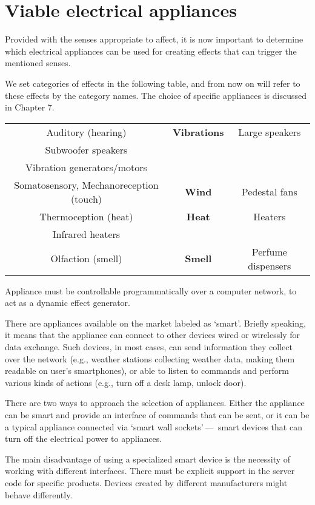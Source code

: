 \hypertarget{x-viable-electrical-appliances}{\section{Viable electrical appliances}}
Provided with the senses appropriate to affect, it is now important to determine
which electrical appliances can be used for creating effects that can trigger 
the mentioned senses.

We set categories of effects in the following table, and from now on will
refer to these effects by the category names. The choice of specific appliances
is discussed in Chapter 7.

\begin{center}
\begin{tabular}{|c|c|c|}
\hline
Auditory (hearing) & \textbf{Vibrations} & Large speakers \\ 
Subwoofer speakers \\ 
Vibration generators/motors \\ 
Somatosensory, Mechanoreception (touch) & \textbf{Wind} & Pedestal fans \\ 
Thermoception (heat) & \textbf{Heat} & Heaters \\ 
Infrared heaters \\ 
Olfaction (smell) & \textbf{Smell} & Perfume dispensers \\ 
\hline
\end{tabular}
\end{center}

Appliance must be controllable programmatically over a computer network,
to act as a dynamic effect generator.


There are appliances available on the market labeled as `smart'.
Briefly speaking, it means that the appliance
can connect to other devices wired or wirelessly for data exchange. \cite{wisd}
Such devices, in most cases, can send information they collect over
the network (e.g., weather stations collecting weather data, making them readable
on user’s smartphones), or able to listen to commands and perform various
kinds of actions (e.g., turn off a desk lamp, unlock door).

There are two ways to approach the selection of appliances. Either the
appliance can be smart and provide an interface of commands that can be sent, or
it can be a typical appliance connected via `smart wall sockets' — 
smart devices that can turn off the electrical power to appliances.

The main disadvantage of using a specialized smart device is the necessity of
working with different interfaces. There must be explicit
support in the server code for specific products. Devices created by different
manufacturers might behave differently.

